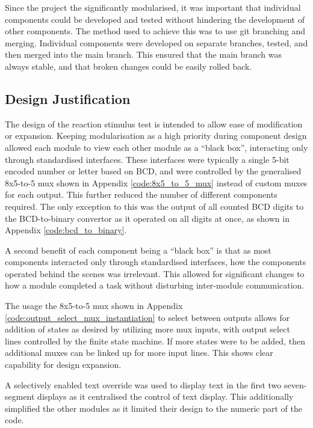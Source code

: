 \documentclass[11pt]{article}
\begin{document}
Since the project the significantly modularised, it was important that individual components could be developed and tested without hindering the development of other components. The method used to achieve this was to use git branching and merging. Individual components were developed on separate branches, tested, and then merged into the main branch. This ensured that the main branch was always stable, and that broken changes could be easily rolled back.

\subsection{Design Justification}
The design of the reaction stimulus test is intended to allow ease of modification or expansion. Keeping modularisation as a high priority during component design allowed each module to view each other module as a ``black box'', interacting only through standardised interfaces. These interfaces were typically a single 5-bit encoded number or letter based on BCD, and were controlled by the generalised 8x5-to-5 mux shown in Appendix \ref{code:8x5_to_5_mux} instead of custom muxes for each output. This further reduced the number of different components required. The only exception to this was the output of all counted BCD digits to the BCD-to-binary convertor as it operated on all digits at once, as shown in Appendix \ref{code:bcd_to_binary}.

A second benefit of each component being a ``black box'' is that as most components interacted only through standardised interfaces, how the components operated behind the scenes was irrelevant. This allowed for significant changes to how a module completed a task without disturbing inter-module communication.

The usage the 8x5-to-5 mux shown in Appendix \ref{code:output_select_mux_instantiation} to select between outputs allows for addition of states as desired by utilizing more mux inputs, with output select lines controlled by the finite state machine. If more states were to be added, then additional muxes can be linked up for more input lines. This shows clear capability for design expansion.

A selectively enabled text override was used to display text in the first two seven-segment displays as it centralised the control of text display. This additionally simplified the other modules as it limited their design to the numeric part of the code.

\end{document}
